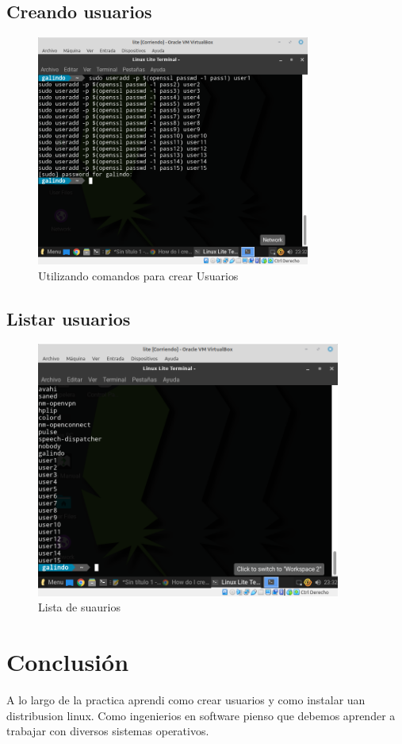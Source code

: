 \documentclass[11pt]{article}
\begin{document}
\subsection{Creando usuarios}
\label{sec:org5e9f2f9}
\begin{figure}[htbp]
\centering
\includegraphics[width=9cm]{img/Captura de pantalla de 2023-09-17 23-32-10.png}
\caption{Utilizando comandos para crear Usuarios}
\end{figure}

\pagebreak

\subsection{Listar usuarios}
\label{sec:org3f1105d}
\begin{figure}[htbp]
\centering
\includegraphics[width=10cm]{img/Captura de pantalla de 2023-09-17 23-32-29.png}
\caption{Lista de suaurios}
\end{figure}

\section{Conclusión}
\label{sec:org21c5978}
A lo largo de la practica aprendi como crear usuarios y como 
instalar uan distribusion linux. Como ingenierios en software pienso que debemos 
aprender a trabajar con diversos sistemas operativos.
\end{document}

